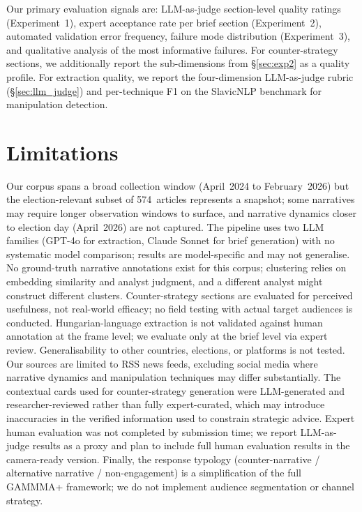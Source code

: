 \documentclass[10pt, a4paper]{article}
\begin{document}
Our primary evaluation signals are: LLM-as-judge section-level quality ratings (Experiment~1), expert acceptance rate per brief section (Experiment~2), automated validation error frequency, failure mode distribution (Experiment~3), and qualitative analysis of the most informative failures. For counter-strategy sections, we additionally report the sub-dimensions from \S\ref{sec:exp2} as a quality profile. For extraction quality, we report the four-dimension LLM-as-judge rubric (\S\ref{sec:llm_judge}) and per-technique F1 on the SlavicNLP benchmark for manipulation detection.


\section{Limitations}
\label{sec:limitations}

Our corpus spans a broad collection window (April~2024 to February~2026) but the election-relevant subset of 574~articles represents a snapshot; some narratives may require longer observation windows to surface, and narrative dynamics closer to election day (April~2026) are not captured. The pipeline uses two LLM families (GPT-4o for extraction, Claude Sonnet for brief generation) with no systematic model comparison; results are model-specific and may not generalise. No ground-truth narrative annotations exist for this corpus; clustering relies on embedding similarity and analyst judgment, and a different analyst might construct different clusters. Counter-strategy sections are evaluated for perceived usefulness, not real-world efficacy; no field testing with actual target audiences is conducted. Hungarian-language extraction is not validated against human annotation at the frame level; we evaluate only at the brief level via expert review. Generalisability to other countries, elections, or platforms is not tested. Our sources are limited to RSS news feeds, excluding social media where narrative dynamics and manipulation techniques may differ substantially. The contextual cards used for counter-strategy generation were LLM-generated and researcher-reviewed rather than fully expert-curated, which may introduce inaccuracies in the verified information used to constrain strategic advice. Expert human evaluation was not completed by submission time; we report LLM-as-judge results as a proxy and plan to include full human evaluation results in the camera-ready version. Finally, the response typology (counter-narrative / alternative narrative / non-engagement) is a simplification of the full GAMMMA+ framework; we do not implement audience segmentation or channel strategy.
\end{document}
